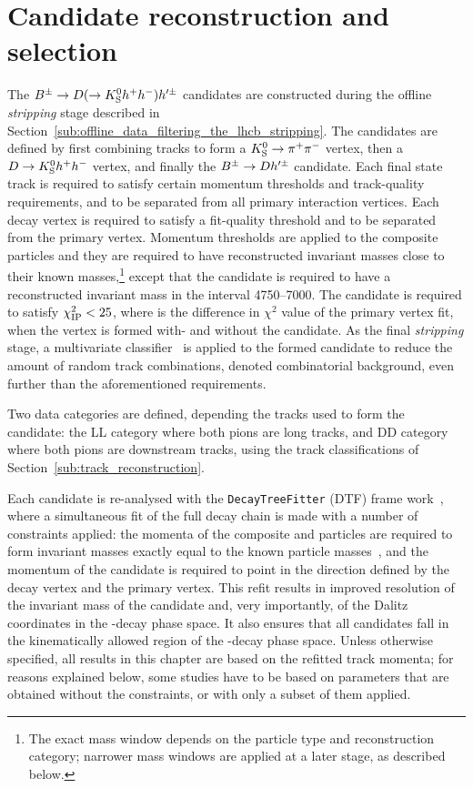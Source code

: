 \section{Candidate reconstruction and selection} %
\label{sec:candidate_selection}

The ${{B}^\pm}\rightarrow{\ensuremath{D}}(\rightarrow{\ensuremath{{K}^0_{\mathrm{S}}}} h^+h^-)h'^\pm$ candidates are constructed during the offline \emph{stripping} stage described in Section~\ref{sub:offline_data_filtering_the_lhcb_stripping}. The candidates are defined by first combining tracks to form a ${{K}^0_{\mathrm{S}}}\rightarrow{\ensuremath{{\pi}^+}}{\ensuremath{{\pi}^-}}$ vertex, then a ${D}\rightarrow{\ensuremath{{K}^0_{\mathrm{S}}}} h^+h^-$ vertex, and finally the ${{B}^\pm}\rightarrow{\ensuremath{D}} h'^\pm$ candidate. Each final state track is required to satisfy certain momentum thresholds and track-quality requirements, and to be separated from all primary interaction vertices. Each decay vertex is required to satisfy a fit-quality threshold and to be separated from the primary vertex. Momentum thresholds are applied to the composite particles and they are required to have reconstructed invariant masses close to their known masses,\footnote{The exact mass window depends on the particle type and reconstruction category; narrower mass windows are applied at a later stage, as described below.} except that the \B candidate is required to have a reconstructed invariant mass in the interval 4750--7000\mevcc. The \B candidate is required to satisfy $\chi^2_{\text{IP}} <25$, where \ipchisq is the difference in $\chi^2$ value of the primary vertex fit, when the vertex is formed with- and without the \B candidate. As the final \emph{stripping} stage, a multivariate classifier~\cite{gligorovEfficientReliableFast2013} is applied to the formed \B candidate to reduce the amount of random track combinations, denoted combinatorial background, even further than the aforementioned requirements.

Two data categories are defined, depending the tracks used to form the \KS candidate: the LL category where both pions are long tracks, and DD category where both pions are downstream tracks, using the track classifications of Section~\ref{sub:track_reconstruction}.


Each candidate is re-analysed with the \texttt{DecayTreeFitter} (DTF) frame work~\cite{DTF}, where a simultaneous fit of the full decay chain is made with a number of constraints applied: the momenta of the composite \D and \KS particles are required to form invariant masses exactly equal to the known particle masses~\cite{PDG2020}, and the momentum of the \B candidate is required to point in the direction defined by the \B decay vertex and the primary vertex. This refit results in improved resolution of the invariant mass of the \B candidate and, very importantly, of the Dalitz coordinates in the \D-decay phase space. It also ensures that all candidates fall in the kinematically allowed region of the \D-decay phase space. Unless otherwise specified, all results in this chapter are based on the refitted track momenta; for reasons explained below, some studies have to be based on parameters that are obtained without the constraints, or with only a subset of them applied.



